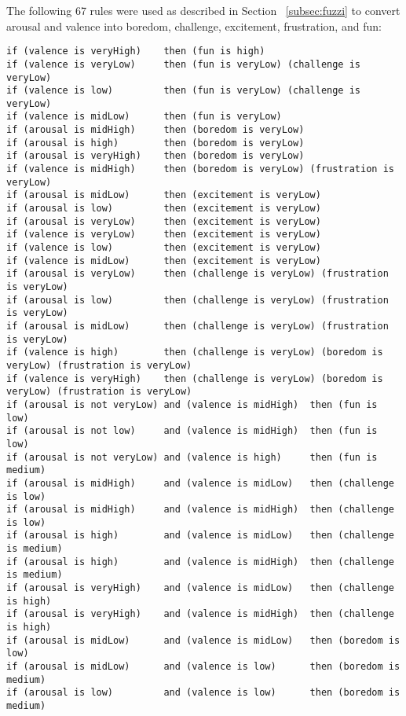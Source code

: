 
The following 67 rules were used as described in Section ~\ref{subsec:fuzzi} to convert arousal and valence into boredom, challenge, excitement, frustration, and fun:

%

\begin{lstlisting}[frame=none]
if (valence is veryHigh)    then (fun is high)
if (valence is veryLow)     then (fun is veryLow) (challenge is veryLow)
if (valence is low)         then (fun is veryLow) (challenge is veryLow)
if (valence is midLow)      then (fun is veryLow)
if (arousal is midHigh)     then (boredom is veryLow)
if (arousal is high)        then (boredom is veryLow)
if (arousal is veryHigh)    then (boredom is veryLow)
if (valence is midHigh)     then (boredom is veryLow) (frustration is veryLow)
if (arousal is midLow)      then (excitement is veryLow)
if (arousal is low)         then (excitement is veryLow)
if (arousal is veryLow)     then (excitement is veryLow)
if (valence is veryLow)     then (excitement is veryLow)
if (valence is low)         then (excitement is veryLow)
if (valence is midLow)      then (excitement is veryLow)
if (arousal is veryLow)     then (challenge is veryLow) (frustration is veryLow)
if (arousal is low)         then (challenge is veryLow) (frustration is veryLow)
if (arousal is midLow)      then (challenge is veryLow) (frustration is veryLow)
if (valence is high)        then (challenge is veryLow) (boredom is veryLow) (frustration is veryLow)
if (valence is veryHigh)    then (challenge is veryLow) (boredom is veryLow) (frustration is veryLow)
if (arousal is not veryLow) and (valence is midHigh)  then (fun is low)
if (arousal is not low)     and (valence is midHigh)  then (fun is low)
if (arousal is not veryLow) and (valence is high)     then (fun is medium)
if (arousal is midHigh)     and (valence is midLow)   then (challenge is low)
if (arousal is midHigh)     and (valence is midHigh)  then (challenge is low)
if (arousal is high)        and (valence is midLow)   then (challenge is medium)
if (arousal is high)        and (valence is midHigh)  then (challenge is medium)
if (arousal is veryHigh)    and (valence is midLow)   then (challenge is high)
if (arousal is veryHigh)    and (valence is midHigh)  then (challenge is high)
if (arousal is midLow)      and (valence is midLow)   then (boredom is low)
if (arousal is midLow)      and (valence is low)      then (boredom is medium)
if (arousal is low)         and (valence is low)      then (boredom is medium)

\end{lstlisting}
